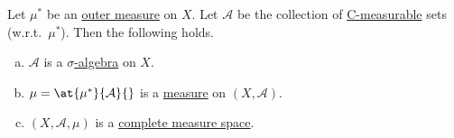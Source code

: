 \begin{theorem}\label{thm:Caratheodory-extension}
	Let \(\mu^{\ast} \) be an \hyperref[def:outer-measure]{outer measure} on \(X\). Let \(\mathcal{A} \) be the collection of \hyperref[def:C-measurable]{C-measurable} sets (w.r.t.\ \(\mu^{\ast} \)). Then the following holds.
	\begin{enumerate}[(a)]
		\item\label{thm:Caratheodory-extension-a} \(\mathcal{A}\) is a \hyperref[def:sigma-algebra]{\(\sigma\)-algebra} on \(X\).
		\item\label{thm:Caratheodory-extension-b} \(\mu = \at{\mu^{\ast} }{\mathcal{A} }{}\) is a \hyperref[def:measure]{measure} on \((X, \mathcal{A})\).
		\item\label{thm:Caratheodory-extension-c} \((X, \mathcal{A} , \mu)\) is a \hyperref[def:complete-measure-space]{complete measure space}.
	\end{enumerate}
\end{theorem}
